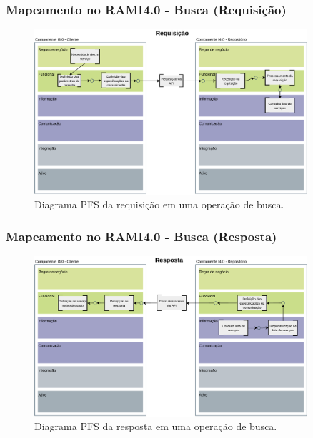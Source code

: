 \documentclass[10pt]{beamer}
\begin{document}
\begin{frame}
	
	\frametitle{Mapeamento no RAMI4.0 - Busca (Requisição)}
	
	\begin{figure}[htb]
		\centering
		\caption{Diagrama PFS da requisição em uma operação de busca.}
		\label{fig:rami-busca-requisicao}
		\includegraphics[width=0.9\textwidth]{rami-busca-requisicao}

	\end{figure}
	
\end{frame}
\begin{frame}
	
	\frametitle{Mapeamento no RAMI4.0 - Busca (Resposta)}
	
	\begin{figure}[htb]
		\centering
		\caption{Diagrama PFS da resposta em uma operação de busca.}
		\label{fig:rami-busca-resposta}
		\includegraphics[width=0.9\textwidth]{rami-busca-resposta}

	\end{figure}

\end{frame}
\end{document}
